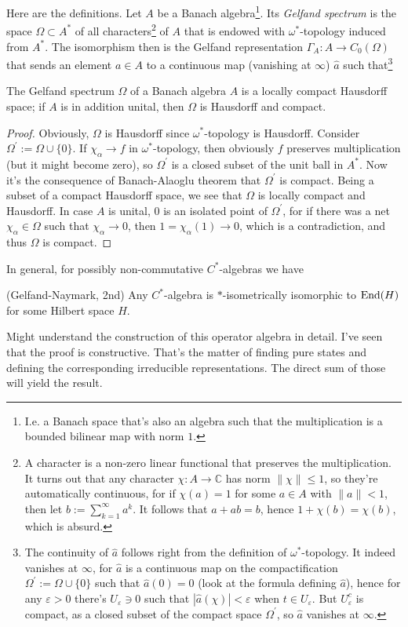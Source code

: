 Here are the definitions. Let $A$ be a Banach algebra\footnote{I.e. a Banach space that's also an algebra such that the multiplication is a bounded bilinear map with norm $1$.}. Its \emph{Gelfand spectrum} is the space $\Omega \subset A^*$ of all characters\footnote{A character is a non-zero linear functional that preserves the multiplication. It turns out that any character $\chi : A \rightarrow \mathbb C$ has norm $\|\chi\| \leq 1$, so they're automatically continuous, for if $\chi(a) = 1$ for some $a \in A$ with $\|a\| <1$, then let $b:=\sum_{k=1}^\infty a^k$. It follows that $a + ab = b$, hence $1 + \chi(b) = \chi(b)$, which is absurd. } of $A$  that is endowed with $\omega^*$-topology induced from $A^*$. The isomorphism then is the Gelfand representation $\Gamma_A : A \rightarrow C_0(\Omega)$ that sends an element $a \in A$ to a continuous map (vanishing at $\infty$) $\hat a$ such that\footnote{The continuity of $\hat a$ follows right from the definition of $\omega^*$-topology. It indeed vanishes at $\infty$, for $\hat a$ is a continuous map on the compactification $\Omega^\prime := \Omega \cup \{0\}$ such that $\hat{a}(0) = 0$ (look at the formula defining $\hat{a}$), hence for any $\varepsilon > 0$ there's $U_{\varepsilon} \ni 0$ such that $|\hat{a}(\chi)| < \varepsilon$ when $t \in U_{\varepsilon}$. But $U_{\varepsilon}^c$ is compact, as a closed subset of the compact space $\Omega^\prime$, so $\hat a$ vanishes at $\infty$.}
\begin{proposition}
The Gelfand spectrum $\Omega$ of a Banach algebra $A$ is a locally compact Hausdorff space; if $A$ is in addition unital, then $\Omega$ is Hausdorff and compact.
\end{proposition}
\begin{proof}
Obviously, $\Omega$ is Hausdorff since $\omega^*$-topology is Hausdorff. Consider $\Omega^\prime := \Omega \cup \{0\}$. If $\chi_\alpha \rightarrow f$ in $\omega^*$-topology, then obviously $f$ preserves multiplication (but it might become zero), so $\Omega^\prime$ is a closed subset of the unit ball in $A^*$. Now it's the consequence of Banach-Alaoglu theorem that $\Omega^\prime$ is compact. Being a subset of a compact Hausdorff space, we see that $\Omega$ is locally compact and Hausdorff. In case $A$ is unital, $0$ is an isolated point of $\Omega^\prime$, for if there was a net $\chi_\alpha \in \Omega$ such that $\chi_\alpha \rightarrow 0$, then $1 = \chi_\alpha(1) \rightarrow 0$, which is a contradiction, and thus $\Omega$ is compact.
\end{proof}

In general, for possibly non-commutative $C^*$-algebras we have 
\begin{theorem}
(Gelfand-Naymark, 2nd) Any $C^*$-algebra is $*$-isometrically isomorphic to $\operatorname{End}(H)$ for some Hilbert space $H$.
\end{theorem}
\begin{fur}
Might understand the construction of this operator algebra in detail. I've seen that the proof is constructive. That's the matter of finding pure states and defining the corresponding irreducible representations. The direct sum of those will yield the result.
\end{fur}